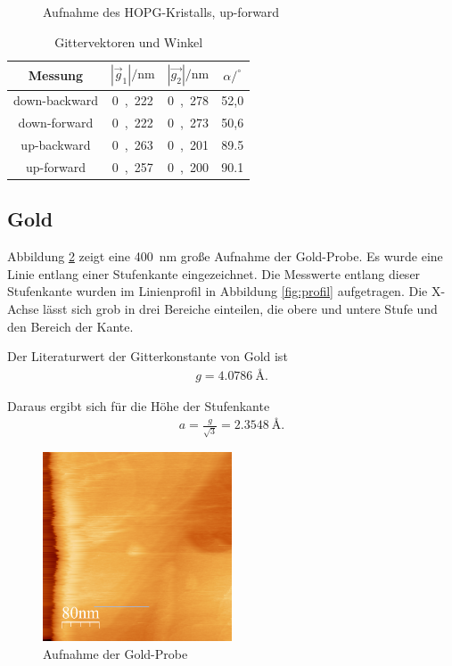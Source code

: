 \begin{figure}
	\centering
	\resizebox{12cm}{!}{
		
	}
	\caption{Aufnahme des HOPG-Kristalls, up-forward}
	\label{fig:up-forward}
\end{figure}

\begin{table}[H]
	\begin{center}
		\begin{tabular}{c c c c}
			\toprule
			Messung & $|\vec{g}_1| / \mathrm{nm}$ & $|\vec{g_2}| / \mathrm{nm}$ & $\alpha /^\circ $ \\
			\midrule
			down-backward & \si{0,222} & \si{0,278} & 52,0 \\
			down-forward & \si{0,222} & \si{0,273} & 50,6 \\
			up-backward & \si{0,263} & \si{0,201} & 89.5 \\
			up-forward & \si{0,257} & \si{0,200} & 90.1 \\
			\bottomrule
		\end{tabular}
		\caption{Gittervektoren und Winkel}
		\label{fig:t1}
	\end{center}
\end{table}

\subsection{Gold}

Abbildung \ref{fig:gold} zeigt eine \SI{400}{\nano \meter} große Aufnahme der Gold-Probe.
Es wurde eine Linie entlang einer Stufenkante eingezeichnet.
Die Messwerte entlang dieser Stufenkante wurden im Linienprofil in Abbildung \ref{fig:profil} aufgetragen.
Die X-Achse lässt sich grob in drei Bereiche einteilen, die obere und untere Stufe und den Bereich der Kante.

Der Literaturwert\cite{gold} der Gitterkonstante von Gold ist
\begin{align}
	g = \SI{4,0786}{\angstrom}.
\end{align}

Daraus ergibt sich für die Höhe der Stufenkante
\begin{align}
	a = \frac{g}{\sqrt{3}} = \SI{2,3548}{\angstrom}.
\end{align}

\begin{figure}
	\centering
	\includegraphics[width=0.5\textwidth]{gold}
	\caption{Aufnahme der Gold-Probe}
	\label{fig:gold}
\end{figure}

